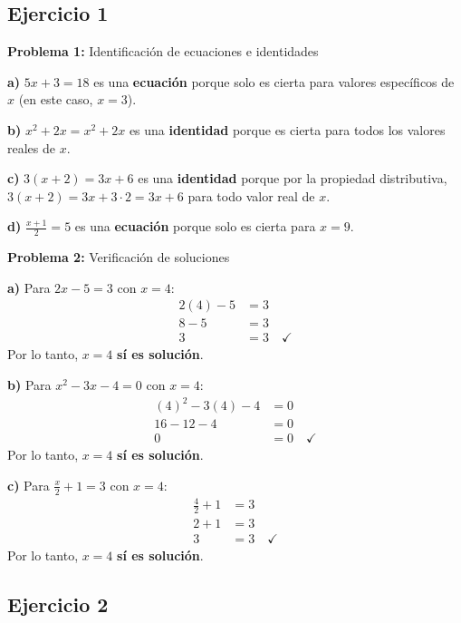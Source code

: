 
\subsection*{Ejercicio 1}

\textbf{Problema 1:} Identificación de ecuaciones e identidades

\textbf{a)} $5x + 3 = 18$ es una \textbf{ecuación} porque solo es cierta para valores específicos de $x$ (en este caso, $x = 3$).

\textbf{b)} $x^2 + 2x = x^2 + 2x$ es una \textbf{identidad} porque es cierta para todos los valores reales de $x$.

\textbf{c)} $3(x + 2) = 3x + 6$ es una \textbf{identidad} porque por la propiedad distributiva, $3(x + 2) = 3x + 3 \cdot 2 = 3x + 6$ para todo valor real de $x$.

\textbf{d)} $\frac{x+1}{2} = 5$ es una \textbf{ecuación} porque solo es cierta para $x = 9$.

\textbf{Problema 2:} Verificación de soluciones

\textbf{a)} Para $2x - 5 = 3$ con $x = 4$:
\begin{align}
2(4) - 5 &= 3\\
8 - 5 &= 3\\
3 &= 3 \quad \checkmark
\end{align}
Por lo tanto, $x = 4$ \textbf{sí es solución}.

\textbf{b)} Para $x^2 - 3x - 4 = 0$ con $x = 4$:
\begin{align}
(4)^2 - 3(4) - 4 &= 0\\
16 - 12 - 4 &= 0\\
0 &= 0 \quad \checkmark
\end{align}
Por lo tanto, $x = 4$ \textbf{sí es solución}.

\textbf{c)} Para $\frac{x}{2} + 1 = 3$ con $x = 4$:
\begin{align}
\frac{4}{2} + 1 &= 3\\
2 + 1 &= 3\\
3 &= 3 \quad \checkmark
\end{align}
Por lo tanto, $x = 4$ \textbf{sí es solución}.

\subsection*{Ejercicio 2}

